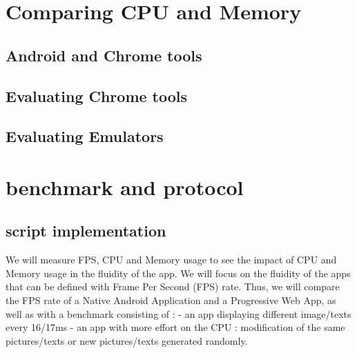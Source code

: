 \fi
    
\section{Comparing CPU and Memory}
    \subsection{Android and Chrome tools}
    \subsection{Evaluating Chrome tools}
    \subsection{Evaluating Emulators}
\section{benchmark and protocol}

\subsection{script implementation}

We will measure FPS, CPU and Memory usage to see the impact of CPU and Memory usage in the fluidity of the app.
\newline
We will focus on the fluidity of the apps that can be defined with Frame Per Second (FPS) rate.
Thus, we will compare the FPS rate of a Native Android Application and a Progressive Web App, as well as with a benchmark consisting of : 
    - an app displaying different image/texts every 16/17ms
    - an app with more effort on the CPU : modification of the same pictures/texts or new pictures/texts generated randomly.
\newline

